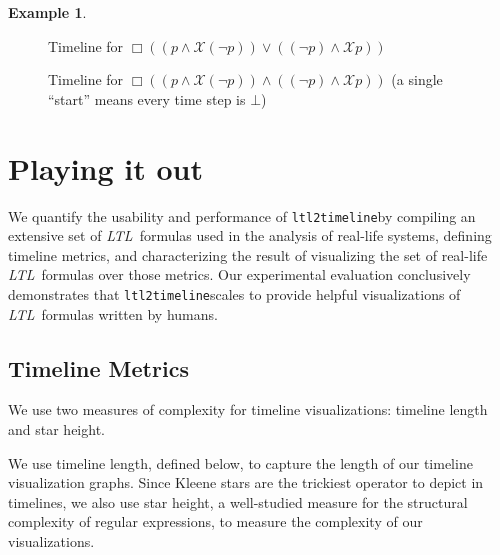 \documentclass[conference]{IEEEtran}
\theoremstyle{definition}
\newtheorem{example}{Example}[section]
\theoremstyle{remark}
\newcommand{\always}{\Box}
\newcommand{\nextt}{\mathcal{X}}
\newcommand{\ltl}{\textit{LTL}}
\newcommand{\tool}{\texttt{ltl2timeline}}
\begin{document}
\begin{example}
\begin{figure}[!h]
  \caption{Timeline for $\always ((p \land \nextt (\lnot p)) \lor ((\lnot p) \land \nextt p))$}
  \label{fig:oscillates1}
\end{figure}
\begin{figure}[!h]
  \centering
  \caption{Timeline for $\always ((p \land \nextt (\lnot p)) \land ((\lnot p) \land \nextt p))$ (a single ``start'' means every time step is $\bot$)}
  \label{fig:oscillates2}
\end{figure}
\end{example}

\section{Playing it out} \label{sec:playing}%

We quantify the usability and performance of \tool by compiling an extensive set of \ltl\ formulas used in the analysis of real-life systems, defining timeline metrics, and characterizing the result of visualizing the set of real-life \ltl\ formulas over those metrics.
Our experimental evaluation conclusively demonstrates that \tool scales to provide helpful visualizations of \ltl\ formulas written by humans.


\subsection{Timeline Metrics}
\label{sec:metrics}


We use two measures of complexity for timeline visualizations: timeline length and star height.

We use timeline length, defined below, to capture the length of our timeline visualization graphs. Since Kleene stars are the trickiest operator to depict in timelines, we also use star height, a well-studied measure for the structural complexity of regular expressions, to measure the complexity of our visualizations.
\end{document}
